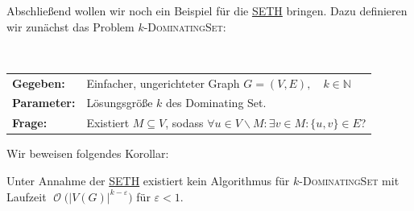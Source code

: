\documentclass[a4paper,ngerman]{atseminar}
\newcommand{\N}{\ensuremath{\mathbb{N}}\xspace}
\newcommand{\BigO}[1]{\ensuremath{\operatorname{\mathcal{O}}\bigl(#1\bigr)}\xspace}
\begin{document}
\noindent
Abschließend wollen wir noch ein Beispiel für die \hyperref[oe:definition:seth]{SETH} bringen.
Dazu definieren wir zunächst das Problem $k$-\textsc{DominatingSet}:

\begin{definition}
  $ $\newline
  \begin{tabular}{ll}
    \textbf{Gegeben:} & Einfacher, ungerichteter Graph $G = (V, E), \quad k \in \N$ \\
    \textbf{Parameter:} & Lösungsgröße $k$ des Dominating Set. \\
    \textbf{Frage:} & Existiert $M \subseteq V$, sodass $\forall u \in V \backslash M: \exists v \in M : \{u, v\} \in E$?
  \end{tabular}
\end{definition}

\noindent
Wir beweisen folgendes Korollar:

\begin{corollary}
  \label{oe:korollar:seth}
  Unter Annahme der \hyperref[oe:definition:seth]{SETH} existiert kein Algorithmus für $k$-\textsc{DominatingSet}
  mit Laufzeit \BigO{|V(G)|^{k - \varepsilon}} für $\varepsilon < 1$.
\end{corollary}
\end{document}
